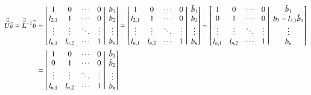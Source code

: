 \documentclass[11pt,english,a4paper]{article}
\begin{document}
\begin{flushleft}
\begin{align*}
\vec{\vec{U}}\vec{\varv} = \vec{\vec{L}}^{-1} \vec{b} &\sim \kl{\left.\begin{matrix} 1 & 0 & \cdots & 0 \\ l_{2,1} & 1 & \cdots & 0 \\ \vdots & \vdots & \ddots & \vdots \\ l_{n,1} & l_{n,2} & \cdots & 1  \end{matrix}\,\,\right\vert\,\,\begin{matrix} b_1 \\ b_2 \\ \vdots \\ b_n\end{matrix}}
= \kl{\left.\begin{matrix} 1 & 0 & \cdots & 0 \\ l_{2,1} & 1 & \cdots & 0 \\ \vdots & \vdots & \ddots & \vdots \\ l_{n,1} & l_{n,2} & \cdots & 1  \end{matrix}\,\,\right\vert\,\,\begin{matrix} \check b_1 \\ b_2 \\ \vdots \\ b_n\end{matrix}}
\sim \kl{\left.\begin{matrix} 1 & 0 & \cdots & 0 \\ 0 & 1 & \cdots & 0 \\ \vdots & \vdots & \ddots & \vdots \\ l_{n,1} & l_{n,2} & \cdots & 1  \end{matrix}\,\,\right\vert\,\,\begin{matrix} \check b_1 \\ b_2 - l_{2,1} \check b_1 \\ \vdots \\ b_n\end{matrix}}
\\
&= \kl{\left.\begin{matrix} 1 & 0 & \cdots & 0 \\ 0 & 1 & \cdots & 0 \\ \vdots & \vdots & \ddots & \vdots \\ l_{n,1} & l_{n,2} & \cdots & 1  \end{matrix}\,\,\right\vert\,\,\begin{matrix} \check b_1 \\ \check b_2 \\ \vdots \\ b_n\end{matrix}}

\end{align*}
\end{flushleft}
\end{document}
